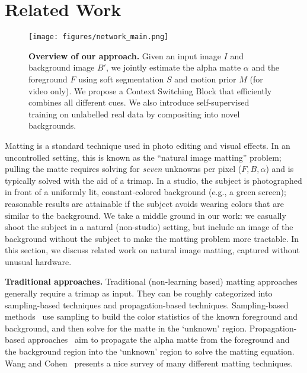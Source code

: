 \documentclass[10pt,twocolumn,letterpaper]{article}
\begin{document}
 \vspace{-0.5em}
\section{Related Work}
\label{sec:related}

\begin{figure*}[!ht]
	\centering
	\texttt{[image: figures/network\_main.png]}    \vspace{-.2cm}
	\caption{\small \textbf{Overview of our approach.} Given an input image $I$ and background image $B'$, we jointly estimate the alpha matte $\alpha$ and the foreground $F$ using soft segmentation $S$ and motion prior $M$ (for video only). We propose a Context Switching Block that efficiently combines all different cues. We also introduce self-supervised training on unlabelled real data by compositing into novel backgrounds.}
	\vspace{-1em}
	\label{fig:networks_main}
\end{figure*}

Matting is a standard technique used in photo editing and visual effects. In an uncontrolled setting, this is known as the ``natural image matting'' problem; pulling the matte requires solving for {\em seven} unknowns per pixel ($F, B, \alpha$) and is typically solved with the aid of a trimap.  In a studio, the subject is photographed in front of a uniformly lit, constant-colored background (e.g., a green screen); reasonable results are attainable if the subject avoids wearing colors that are similar to the background.  We take a middle ground in our work: we casually shoot the subject in a natural (non-studio) setting, but include an image of the background without the subject to make the matting problem more tractable.  In this section, we discuss related work on natural image matting, captured without unusual hardware.



\textbf{Traditional approaches.} Traditional (non-learning based) matting approaches generally require a trimap as input.  They can be roughly categorized into sampling-based techniques and propagation-based techniques. Sampling-based methods~\cite{gastal2010shared,chuang2001bayesian,he2011global,shahrian2013improving,wang2005iterative,wang2007optimized,aksoy2017designing} use sampling to build the color statistics of the known foreground and background, and then solve for the matte in the `unknown' region. Propagation-based approaches~\cite{chen2013knn,lee2011nonlocal,levin2007closed,levin2008spectral,sun2004poisson,grady2005random,he2010fast} aim to propagate the alpha matte from the foreground and the background region into the `unknown' region to solve the matting equation. Wang and Cohen~\cite{wang2008image} presents a nice survey of many different matting techniques.
\end{document}
